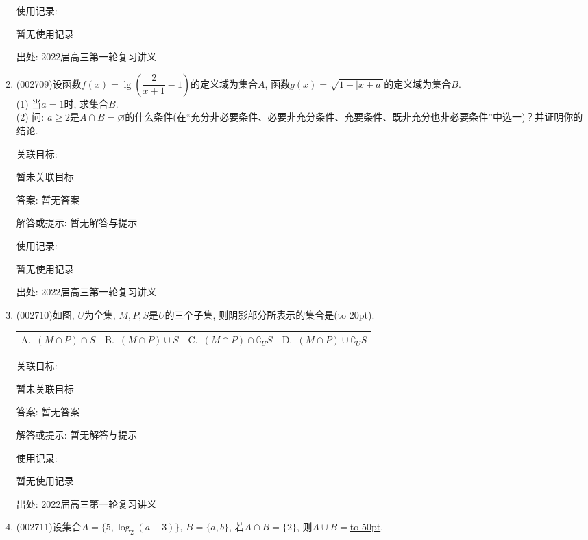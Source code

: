 \documentclass[10pt,a4paper]{article}
\newcommand{\blank}[1]{\underline{\hbox to #1pt{}}}
\newcommand{\bracket}[1]{(\hbox to #1pt{})}
\newcommand{\fourch}[4]{\par\begin{tabular}{p{.23\textwidth}p{.23\textwidth}p{.23\textwidth}p{.23\textwidth}}
A.~#1 &B.~#2& C.~#3& D.~#4
\end{tabular}}
\begin{document}
\begin{enumerate}[1.]
使用记录:

暂无使用记录


出处: 2022届高三第一轮复习讲义
\item { (002709)}设函数$f(x)=\lg (\dfrac2{x+1}-1)$的定义域为集合$A$, 函数$g(x)=\sqrt{1-|x+a|}$的定义域为集合$B$.\\
(1) 当$a=1$时, 求集合$B$.\\
(2) 问: $a\ge 2$是$A\cap B=\varnothing$的什么条件(在``充分非必要条件、必要非充分条件、充要条件、既非充分也非必要条件''中选一)？并证明你的结论.


关联目标:

暂未关联目标

答案: 暂无答案

解答或提示: 暂无解答与提示

使用记录:

暂无使用记录


出处: 2022届高三第一轮复习讲义
\item { (002710)}如图, $U$为全集, $M,P,S$是$U$的三个子集, 则阴影部分所表示的集合是\bracket{20}.
\fourch{$(M\cap P)\cap S$}{$(M\cap P)\cup S$}{$(M\cap P)\cap \complement_U S$}{$(M\cap P)\cup \complement_U S$}
\begin{center}
\end{center}


关联目标:

暂未关联目标

答案: 暂无答案

解答或提示: 暂无解答与提示

使用记录:

暂无使用记录


出处: 2022届高三第一轮复习讲义
\item { (002711)}设集合$A=\{5,\log_2(a+3)\}$, $B=\{a,b\}$, 若$A\cap B=\{2\}$, 则$A\cup B=$\blank{50}.



\end{enumerate}
\end{document}

